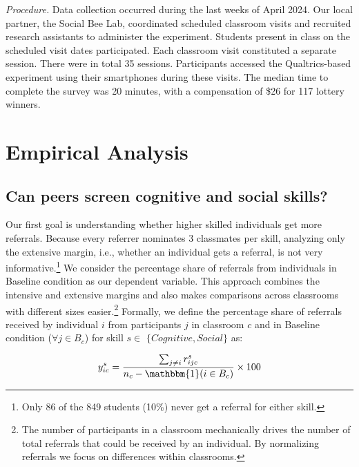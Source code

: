 \documentclass[11pt,a4paper,oneside]{article}
\begin{document}
\noindent \textit{Procedure.} Data collection occurred during the last weeks of April 2024. Our local partner, the Social Bee Lab, coordinated scheduled classroom visits and recruited research assistants to administer the experiment. Students present in class on the scheduled visit dates participated. Each classroom visit constituted a separate session. There were in total 35 sessions. Participants accessed the Qualtrics-based experiment using their smartphones during these visits. The median time to complete the survey was 20 minutes, with a compensation of \$26 for 117 lottery winners.

\section{Empirical Analysis}
\subsection*{Can peers screen cognitive and social skills?}
Our first goal is understanding whether higher skilled individuals get more referrals. Because every referrer nominates 3 classmates per skill, analyzing only the extensive margin, i.e., whether an individual gets a referral, is not very informative.\footnote{Only 86 of the 849 students (10\%) never get a referral for either skill.} We consider the percentage share of referrals from individuals in Baseline condition as our dependent variable. This approach combines the intensive and extensive margins and also makes comparisons across classrooms with different sizes easier.\footnote{The number of participants in a classroom mechanically drives the number of total referrals that could be received by an individual. By normalizing referrals we focus on differences within classrooms.} Formally, we define the percentage share of  referrals received by individual $i$ from participants $j$ in classroom $c$ and in Baseline condition ($\forall j \in B_c$) for skill $s\in$ $\{Cognitive, Social\}$ as: 

\begin{equation}\label{ys_def}
    y_{ic}^s = \frac{\sum_{j \neq i} r_{ijc}^s}{n_{c} - \mathbbm{1}(i \in B_c)} \times 100
    \end{equation}
  
\end{document}
